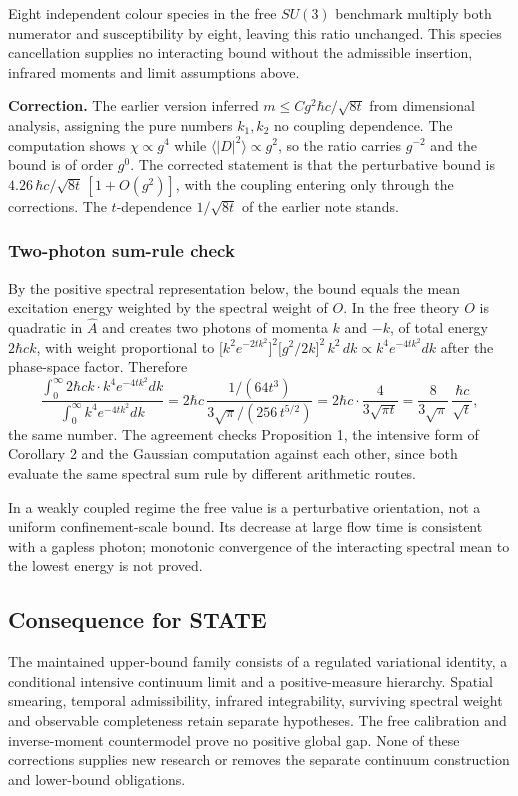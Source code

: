 \documentclass[11pt,a4paper]{article}
\begin{document}
Eight independent colour species in the free \(SU(3)\) benchmark
multiply both numerator and susceptibility by eight, leaving this ratio
unchanged. This species cancellation supplies no interacting bound
without the admissible insertion, infrared moments and limit assumptions
above.

\textbf{Correction.} The earlier version inferred
\(m\le Cg^2\hbar c/\sqrt{8t}\) from dimensional analysis, assigning the
pure numbers \(k_1,k_2\) no coupling dependence. The computation shows
\(\chi\propto g^4\) while \(\langle|D|^2\rangle\propto g^2\), so the
ratio carries \(g^{-2}\) and the bound is of order \(g^0\). The
corrected statement is that the perturbative bound is
\(4.26\,\hbar c/\sqrt{8t}\,[1+O(g^2)]\), with the coupling entering only
through the corrections. The \(t\)-dependence \(1/\sqrt{8t}\) of the
earlier note stands.

\hypertarget{two-photon-sum-rule-check}{%
\subsubsection{Two-photon sum-rule
check}\label{two-photon-sum-rule-check}}

By the positive spectral representation below, the bound equals the mean
excitation energy weighted by the spectral weight of \(O\). In the free
theory \(O\) is quadratic in \(\hat A\) and creates two photons of
momenta \(k\) and \(-k\), of total energy \(2\hbar ck\), with weight
proportional to
\(\big[k^2e^{-2tk^2}\big]^2\big[g^2/2k\big]^2\,k^2\,dk\propto k^4e^{-4tk^2}dk\)
after the phase-space factor. Therefore
\[\frac{\int_0^\infty 2\hbar ck\cdot k^4e^{-4tk^2}dk}{\int_0^\infty k^4e^{-4tk^2}dk}
=2\hbar c\,\frac{1/(64t^3)}{3\sqrt\pi/(256\,t^{5/2})}
=2\hbar c\cdot\frac{4}{3\sqrt{\pi t}}
=\frac{8}{3\sqrt\pi}\,\frac{\hbar c}{\sqrt t},\] the same number. The
agreement checks Proposition 1, the intensive form of Corollary 2 and
the Gaussian computation against each other, since both evaluate the
same spectral sum rule by different arithmetic routes.

In a weakly coupled regime the free value is a perturbative orientation,
not a uniform confinement-scale bound. Its decrease at large flow time
is consistent with a gapless photon; monotonic convergence of the
interacting spectral mean to the lowest energy is not proved.

\hypertarget{consequence-for-state}{%
\subsection{Consequence for STATE}\label{consequence-for-state}}

The maintained upper-bound family consists of a regulated variational
identity, a conditional intensive continuum limit and a positive-measure
hierarchy. Spatial smearing, temporal admissibility, infrared
integrability, surviving spectral weight and observable completeness
retain separate hypotheses. The free calibration and inverse-moment
countermodel prove no positive global gap. None of these corrections
supplies new research or removes the separate continuum construction and
lower-bound obligations.
\end{document}
